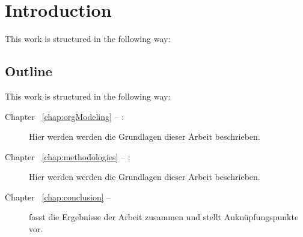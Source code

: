 \chapter{Introduction}
This work is structured in the following way:

\section*{Outline}
This work is structured in the following way:
\begin{description}
\item[Chapter ~\ref{chap:orgModeling} -- :] Hier werden werden die Grundlagen dieser Arbeit beschrieben.
\item[Chapter ~\ref{chap:methodologies} -- :] Hier werden werden die Grundlagen dieser Arbeit beschrieben.
\item[Chapter ~\ref{chap:conclusion} -- ] fasst die Ergebnisse der Arbeit zusammen und stellt Anknüpfungspunkte vor.
\end{description}
